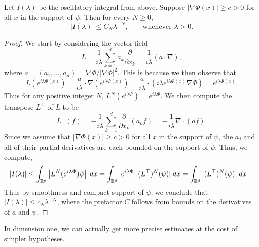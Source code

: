 \documentclass{article}
\begin{document}
\begin{prop}
	Let $I(\lambda)$ be the oscillatory integral from above. Suppose $|\nabla \Phi(x)| \geq c > 0$ for all $x$ in the support of $\psi$. Then for every $N \geq 0$, 
	\begin{equation*}
		|I(\lambda)| \leq C_{N}\lambda^{-N}, \qquad \text{whenever $\lambda > 0$}. 
	\end{equation*} 
\end{prop} 
\begin{proof}
	We start by considering the vector field 
	\begin{equation*}
		L = \frac{1}{i\lambda}\sum_{k = 1}^{d}a_{k}\frac{\partial}{\partial x_{k}} = \frac{1}{i\lambda}(a \cdot \nabla), 
	\end{equation*}
	where $a = (a_{1}, \ldots, a_{n}) = \nabla \Phi/|\nabla \Phi|^{2}$. This is because we then observe that 
	\begin{equation*}
		L(e^{i\lambda \Phi(x)})= \frac{a}{i\lambda}\cdot \nabla(e^{i\lambda \Phi(x)}) = \frac{a}{i\lambda}\cdot \left(i\lambda e^{i\lambda \Phi(x)}\nabla \Phi\right) = e^{i\lambda \Phi(x)}. 
	\end{equation*}
	Thus for any positive integer $N$, $L^{N}(e^{i\lambda \Phi}) = e^{i\lambda \Phi}$. We then compute the transpose $L^{\top}$ of $L$ to be 
	\begin{equation*}
		L^{\top}(f) = -\frac{1}{i\lambda}\sum_{k = 1}^{d}\frac{\partial}{\partial x_{k}}(a_{k}f) = -\frac{1}{i\lambda}\nabla \cdot (af). 
	\end{equation*}
	Since we assume that $|\nabla \Phi(x)|\geq c > 0$ for all $x$ in the support of $\psi$, the $a_j$ and all of their partial derivatives are each bounded on the support of $\psi$. Thus, we compute, 
	\begin{align*}
		\begin{split}
			|I(\lambda)| &\leq \int_{\mathbb{R}^{d}}\left| L^{N}(e^{i\lambda \Phi})\psi \right|\;dx  = \int_{\mathbb{R}^{d}}|e^{i\lambda \Phi}||(L^{\top})^{N}(\psi)|\;dx = \int_{\mathbb{R}^{d}}|(L^{\top})^{N}(\psi)|\;dx 
		\end{split} 
	\end{align*}
	Thus by smoothness and compact support of $\psi$, we conclude that $|I(\lambda)| \leq c_{N}\lambda^{-N}$, where the prefactor $C$ follows from bounds on the derivatives of $a$ and $\psi$. 
\end{proof} 

In dimension one, we can actually get more precise estimates at the cost of simpler hypotheses. 
\end{document}
